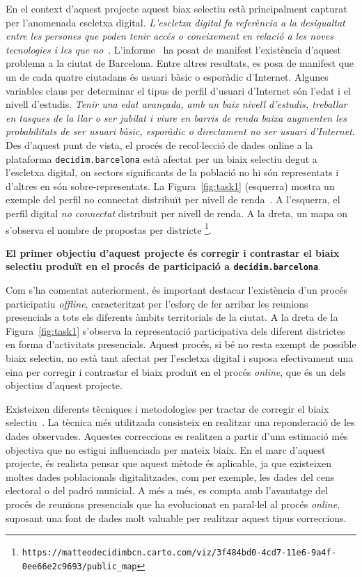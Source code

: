 \documentclass[final,10pt]{article}
\begin{document}
En el context d'aquest projecte aquest biax selectiu est\`a principalment capturat per l'anomenada escletxa digital. 
\emph{L'escletxa digital fa refer\`encia a la desigualtat entre les persones que poden tenir acc\'es o coneixement en relaci\'o a les
noves tecnologies i les que no}~\cite{digital}.
L'informe~\cite{digital} ha posat de manifest l'exist\`encia d'aquest problema a la ciutat de Barcelona. Entre altres resultats, es posa de manifest que un de cada quatre ciutadans \'es usuari b\`asic o espor\`adic d'Internet. 
Algunes variables claus per determinar el tipus de perfil d'usuari d'Internet s\'on l'edat i el nivell d'estudis. 
\emph{Tenir una edat avan\c{c}ada, amb un baix nivell d'estudis, treballar en tasques de la llar o
ser jubilat i viure en barris de renda baixa augmenten les probabilitats de ser usuari b\`asic, espor\`adic o directament no ser usuari d'Internet}.
Des d'aquest punt de vista, el proc\'es de recol$\cdot$lecci\'o de dades online
a la plataforma \texttt{decidim.barcelona} est\`a afectat per un biaix selectiu degut a l'escletxa digital, on sectors significants de la poblaci\'o no hi s\'on representats i d'altres en s\'on sobre-representats.
La Figura~\ref{fig:task1} (esquerra) mostra un exemple del perfil no connectat distribu\"it per nivell de renda~\cite{digital}.
A l'esquerra, el perfil digital \emph{no connectat} distribuit per nivell de renda.
A la dreta, un mapa on s'observa el nombre de propostas per districte
\footnote{\texttt{https://matteodecidimbcn.carto.com/viz/3f484bd0-4cd7-11e6-9a4f-0ee66e2c9693/public\_map}}.

\textbf{El primer objectiu d'aquest projecte \'es corregir i contrastar el biaix selectiu produ\"it en el proc\'es de participaci\'o a \texttt{decidim.barcelona}}.

Com s'ha comentat anteriorment, \'es important destacar l'exist\`encia d'un proc\'es participatiu \emph{offline}, caracteritzat per l'esfor\c{c} de fer arribar les reunions presencials a tots els diferents \`ambits territorials de la ciutat.
A la dreta de la Figura~\ref{fig:task1} s'observa la representaci\'o participativa dels diferent districtes en forma d'activitats presencials.
Aquest proc\'es, si b\'e no resta exempt de possible biaix selectiu, no est\`a tant afectat per l'escletxa digital i suposa efectivament una eina per corregir i contrastar el biaix produ\"it en 
el proc\'es \emph{online}, que \'es un dels objectius d'aquest projecte.

Existeixen diferents t\`ecniques i metodologies per tractar de corregir el biaix selectiu~\cite{huang2006correcting,cortes2008sample,cortes2015adaptation}.
La t\`ecnica m\'es utilitzada consisteix en realitzar una reponderaci\'o de les dades observades.
Aquestes correccions es realitzen a partir d'una estimaci\'o m\'es objectiva que no estigui influenciada per mateix biaix.
En el marc d'aquest projecte, \'es realista pensar que aquest m\`etode \'es aplicable, ja que existeixen moltes dades poblacionals digitalitzades, com per exemple, les dades del cens electoral o del padr\'o municial. A m\'es a m\'es, es compta amb l'avantatge del proc\'es de reunions presencials que ha evolucionat en paral$\cdot$lel al proc\'es \emph{online}, suposant una font de dades molt valuable per  realitzar aquest tipus correccions.
 
\end{document}
